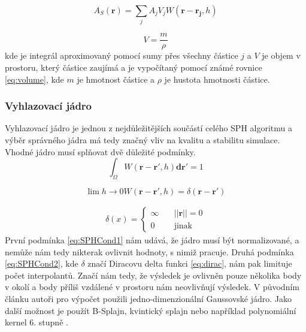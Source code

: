 \begin{equation}
    A_S(\mathbf{r}) = \sum_j A_j V_j W(\mathbf{r} - \mathbf{r_j},h)
    \label{eq:SPHsum}
\end{equation}

\begin{equation}
    V = \frac{m}{\rho}
    \label{eq:volume}
\end{equation}
 kde je integrál aproximovaný pomocí sumy přes všechny částice $j$ a $V$ je objem v prostoru, který částice zaujímá a je vypočítaný pomocí známé rovnice \ref{eq:volume}, kde $m$ je hmotnost částice a $\rho$ je hustota hmotnosti částice.  \cite{KelagerSPH}
 
 \subsubsection{Vyhlazovací jádro}
 Vyhlazovací jádro je jednou z nejdůležitějších součástí celého SPH algoritmu a výběr správného jádra má tedy značný vliv na kvalitu a stabilitu simulace. Vhodné jádro musí splňovat dvě důležité podmínky.
 \begin{equation}
     \int_\Omega W(\mathbf{r} - \mathbf{r}', h)\mathbf{dr}' = 1
     \label{eq:SPHCond1}
 \end{equation}
 
 \begin{equation}
     \lim{h \to 0} W(\mathbf{r} - \mathbf{r}',h) = \delta(\mathbf{r} - \mathbf{r}')
     \label{eq:SPHCond2}
 \end{equation}
 
 \begin{equation} \label{eq:dirac}
\begin{gathered}
\delta(x) =
  \begin{cases}
    \infty  & \quad ||\mathbf{r}|| = 0\\
    0       & \quad \text{jinak} 
  \end{cases}
\end{gathered}
\end{equation}
 První podmínka \ref{eq:SPHCond1} nám udává, že jádro musí být normalizované, a nemůže nám tedy nikterak ovlivnit hodnoty, s nimiž pracuje. Druhá podmínka \ref{eq:SPHCond2}, kde $\delta$ značí Diracovu delta funkci \ref{eq:dirac}, nám pak limituje počet interpolantů. Značí nám tedy, že výsledek je ovlivněn pouze několika body v okolí a body příliš vzdálené v prostoru nám neovlivňují výsledek. V původním článku autoři pro výpočet použili jedno-dimenzionální Gaussovské jádro. Jako další možnost je použít B-Splajn, kvintický splajn \cite{Liu2010} nebo například polynomiální kernel 6. stupně \cite{Muller03}.
 
